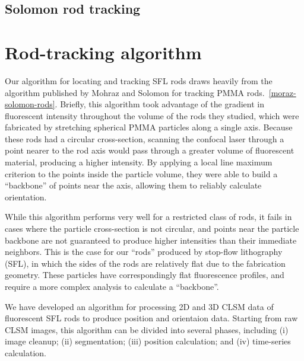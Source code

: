 \subsection{Solomon rod tracking}

\begin{itemize}
\end{itemize}

\section{Rod-tracking algorithm}

Our algorithm for locating and tracking SFL rods draws heavily from the algorithm published by 
Mohraz and Solomon for tracking PMMA rods.~\ref{moraz-solomon-rods}.  Briefly, this algorithm 
took advantage of the gradient in fluorescent intensity throughout the volume of the 
rods they studied, which were fabricated by stretching spherical PMMA particles along a single axis.
Because these rods had a circular cross-section, scanning the confocal laser through a point nearer
to the rod axis would pass through a greater volume of fluorescent material, producing a higher intensity.
By applying a local line maximum criterion to the points inside the particle volume, they were able to 
build a ``backbone'' of points near the axis, allowing them to reliably calculate orientation.

While this algorithm performs very well for a restricted class of rods, it fails in cases where the particle
cross-section is not circular, and points near the particle backbone are not guaranteed to produce higher 
intensities than their immediate neighbors.  This is the case for our ``rods'' produced by stop-flow
lithography (SFL), in which the sides of the rods are relatively flat due to the fabrication
geometry. These particles have correspondingly flat fluorescence profiles, and require a more complex analysis
to calculate a ``backbone''.

We have developed an algorithm for processing 2D and 3D CLSM data of fluorescent SFL rods to
produce position and orientaion data.  Starting from raw CLSM images, this algorithm can be divided
into several phases, including (i) image cleanup; (ii) segmentation; (iii) position calculation; and
(iv) time-series calculation.  

